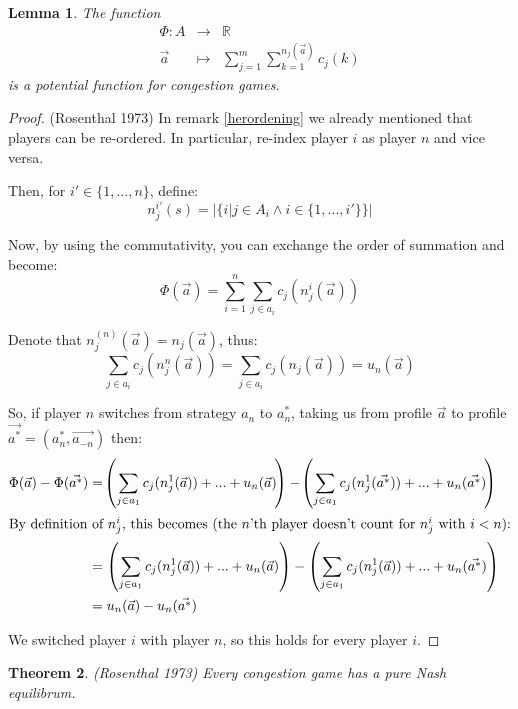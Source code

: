 \documentclass[a4paper,11pt]{article}
\newtheorem{theorem}{Theorem}[section]
\newtheorem{lemma}[theorem]{Lemma}
\newcommand{\R}{{\mathbb R}}
\begin{document}
\begin{lemma}
The function 
\begin{eqnarray*}
\Phi: A &\rightarrow& \R\\
\vec{a} &\mapsto& \displaystyle\sum_{j=1}^{m}\displaystyle\sum_{k=1}^{n_j(\vec{a})} c_j(k)
\end{eqnarray*}
is a potential function for congestion games.
\end{lemma}

\begin{proof}\cite{7,8}(Rosenthal 1973)
In remark \ref{herordening} we already mentioned that players can be re-ordered. In particular, re-index player $i$ as player $n$ and vice versa.

Then, for $i' \in \{1,...,n\}$, define:
$$n_j^{i'}(s) =   |\{i | j \in A_i \wedge i \in \{1,...,i'\}\}|$$

Now, by using the commutativity, you can exchange the order of summation and become:
$$\Phi(\vec{a}) = \displaystyle\sum_{i=1}^{n}\displaystyle\sum_{j\in a_i} c_j(n_j^i(\vec{a}))$$

Denote that $n_j^(n)(\vec{a}) = n_j(\vec{a})$, thus:
$$\displaystyle\sum_{j\in a_i} c_j(n_j^n(\vec{a})) = \displaystyle\sum_{j\in a_i} c_j(n_j(\vec{a})) = u_n(\vec{a})$$

So, if player $n$ switches from strategy $a_n$ to $a_n^*$, taking us from profile $\vec{a}$ to profile $\vec{a^*}=(a_n^*, \vec{a_{-n}})$ then:\\

\begin{align*}
\Phi(\vec{a}) - \Phi(\vec{a^*}) &= \!\left(\sum_{j\in a_1} c_j(n_j^1(\vec{a})) + ... + u_n(\vec{a}) \!\right) - \!\left(\sum_{j\in a_1} c_j(n_j^1(\vec{a^*})) + ... + u_n(\vec{a^*}) \!\right)\\
\intertext{By definition of $n_j^i$, this becomes (the $n$'th player doesn't count for $n_j^i$ with $i < n$):}
&= \left(\sum_{j\in a_1} c_j(n_j^1(\vec{a})) + ... + u_n(\vec{a}) \right) - \left(\sum_{j\in a_1} c_j(n_j^1(\vec{a})) + ... + u_n(\vec{a^*}) \right)\\
&= u_n(\vec{a}) - u_n(\vec{a^*}) 
\end{align*}

We switched player $i$ with player $n$, so this holds for every player $i$.

\end{proof}


\begin{theorem}\cite{7}(Rosenthal 1973)
Every congestion game has a pure Nash equilibrum.
\end{theorem}
\end{document}
